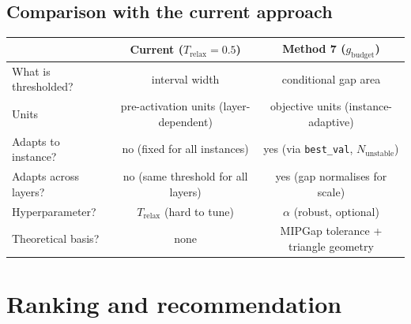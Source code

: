 \documentclass[11pt,a4paper]{article}
\newcommand{\Trelax}{T_{\mathrm{relax}}}
\begin{document}
\subsection{Comparison with the current approach}

\begin{center}
\renewcommand{\arraystretch}{1.3}
\begin{tabular}{@{}l c c@{}}
\toprule
& \textbf{Current} ($\Trelax = 0.5$)
& \textbf{Method 7} ($g_{\mathrm{budget}}$) \\
\midrule
What is thresholded?
  & interval width & conditional gap area \\
Units
  & pre-activation units (layer-dependent)
  & objective units (instance-adaptive) \\
Adapts to instance?
  & no (fixed for all instances)
  & yes (via \texttt{best\_val}, $N_{\mathrm{unstable}}$) \\
Adapts across layers?
  & no (same threshold for all layers)
  & yes (gap normalises for scale) \\
Hyperparameter?
  & $\Trelax$ (hard to tune)
  & $\alpha$ (robust, optional) \\
Theoretical basis?
  & none
  & MIPGap tolerance + triangle geometry \\
\bottomrule
\end{tabular}
\end{center}


\section{Ranking and recommendation}\label{sec:ranking}
\end{document}
